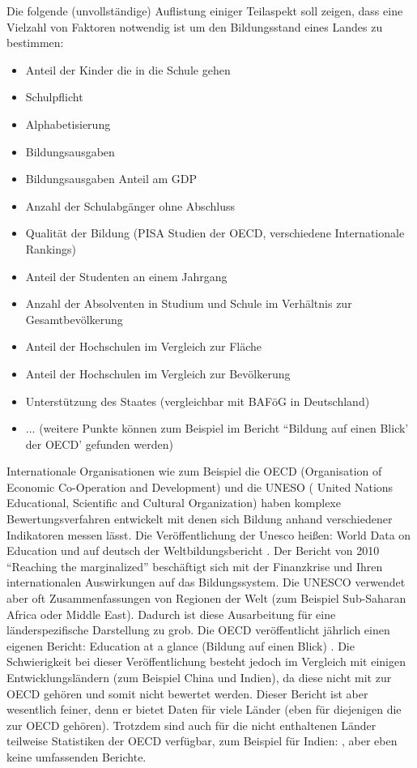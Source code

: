 Die folgende (unvollständige) Auflistung einiger Teilaspekt soll zeigen, dass eine Vielzahl von Faktoren notwendig ist um den Bildungsstand eines Landes zu bestimmen:
\begin{itemize} 
\item Anteil der Kinder die in die Schule gehen
\item Schulpflicht
\item Alphabetisierung
\item Bildungsausgaben
\item Bildungsausgaben Anteil am GDP
\item Anzahl der Schulabgänger ohne Abschluss
\item Qualität der Bildung (PISA Studien der OECD, verschiedene Internationale Rankings)
\item Anteil der Studenten an einem Jahrgang
\item Anzahl der Absolventen in Studium und Schule im Verhältnis zur Gesamtbevölkerung
\item Anteil der Hochschulen im Vergleich zur Fläche
\item Anteil der Hochschulen im Vergleich zur Bevölkerung
\item Unterstützung des Staates (vergleichbar mit BAFöG in Deutschland)
\item ... (weitere Punkte können zum Beispiel im Bericht ``Bildung auf einen Blick' der OECD' gefunden werden)
\end{itemize}

Internationale Organisationen wie zum Beispiel die OECD (Organisation of Economic Co-Operation and Development) und die UNESO ( United Nations Educational, Scientific and Cultural Organization) haben komplexe Bewertungsverfahren entwickelt mit denen sich Bildung anhand verschiedener Indikatoren messen lässt.
Die Veröffentlichung der Unesco heißen: World Data on Education \cite{unesco2} und auf deutsch der Weltbildungsbericht \cite{unesco1}. Der Bericht von 2010 ``Reaching the marginalized'' beschäftigt sich mit der Finanzkrise und Ihren internationalen Auswirkungen auf das Bildungssystem. Die UNESCO verwendet aber oft Zusammenfassungen von Regionen der Welt (zum Beispiel Sub-Saharan Africa oder Middle East). Dadurch ist diese Ausarbeitung für eine länderspezifische Darstellung zu grob. 
Die OECD veröffentlicht jährlich einen eigenen Bericht: Education at a glance (Bildung auf einen Blick) \cite{oecd5} . Die Schwierigkeit bei dieser Veröffentlichung  besteht jedoch im Vergleich mit einigen Entwicklungsländern (zum Beispiel China und Indien), da diese nicht mit zur OECD gehören und somit nicht bewertet werden. Dieser Bericht ist aber wesentlich feiner, denn er bietet Daten für viele Länder (eben für diejenigen die zur OECD gehören). Trotzdem sind auch für die nicht enthaltenen Länder teilweise Statistiken der OECD verfügbar, zum Beispiel für Indien: \cite{oecd}, aber eben keine umfassenden Berichte.

